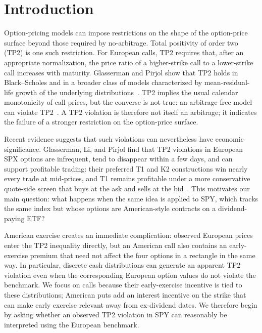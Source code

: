 \documentclass[sigconf,review]{acmart}
\begin{document}


\maketitle

\section{Introduction}
\label{sec:intro}

Option-pricing models can impose restrictions on the shape of the option-price surface beyond those required by no-arbitrage. Total positivity of order two (TP2) is one such restriction. For European calls, TP2 requires that, after an appropriate normalization, the price ratio of a higher-strike call to a lower-strike call increases with maturity. Glasserman and Pirjol show that TP2 holds in Black--Scholes and in a broader class of models characterized by mean-residual-life growth of the underlying distributions~\cite{glasserman2026tp2theory}. TP2 implies the usual calendar monotonicity of call prices, but the converse is not true: an arbitrage-free model can violate TP2~\cite{glasserman2026tp2theory,glasserman2023convexity}. A TP2 violation is therefore not itself an arbitrage; it indicates the failure of a stronger restriction on the option-price surface.

Recent evidence suggests that such violations can nevertheless have economic significance. Glasserman, Li, and Pirjol find that TP2 violations in European SPX options are infrequent, tend to disappear within a few days, and can support profitable trading: their preferred T1 and K2 constructions win nearly every trade at mid-prices, and T1 remains profitable under a more conservative quote-side screen that buys at the ask and sells at the bid~\cite{glasserman2025tp2}. This motivates our main question: what happens when the same idea is applied to SPY, which tracks the same index but whose options are American-style contracts on a dividend-paying ETF?

American exercise creates an immediate complication: observed European prices enter the TP2 inequality directly, but an American call also contains an early-exercise premium that need not affect the four options in a rectangle in the same way. In particular, discrete cash distributions can generate an apparent TP2 violation even when the corresponding European option values do not violate the benchmark. We focus on calls because their early-exercise incentive is tied to these distributions; American puts add an interest incentive on the strike that can make early exercise relevant away from ex-dividend dates. We therefore begin by asking whether an observed TP2 violation in SPY can reasonably be interpreted using the European benchmark.
\end{document}
